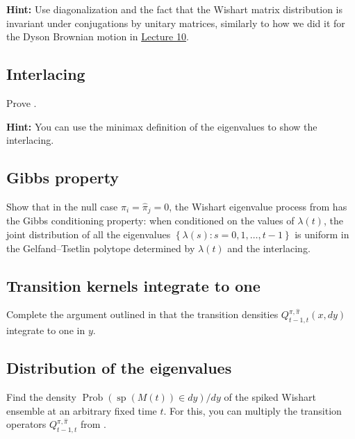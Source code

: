 \documentclass[letterpaper,11pt,oneside,reqno]{article}
\numberwithin{equation}{section}
\theoremstyle{definition}
\begin{document}
\medskip
\noindent
\textbf{Hint:} Use diagonalization and
the fact that the Wishart matrix distribution is invariant under
conjugations by unitary matrices,
similarly to how we did it for the Dyson Brownian motion in
\href{https://lpetrov.cc/rmt25/rmt25-notes/rmt2025-l10.pdf}{Lecture 10}.


\subsection{Interlacing}
\label{prob:interlacing}

Prove .

\medskip
\noindent
\textbf{Hint:} You can use the minimax definition of the eigenvalues to show the interlacing.

\subsection{Gibbs property}
\label{prob:Gibbs}

Show that in the null case \(\pi_i = \hat\pi_j = 0\), the
Wishart eigenvalue process
from 
has the Gibbs conditioning property:
when conditioned on the values of
$\lambda(t)$, the joint distribution of
all the eigenvalues
$\left\{ \lambda(s)\colon s=0,1,\ldots,t-1  \right\}$
is uniform in the Gelfand--Tsetlin polytope
determined by $\lambda(t)$ and the interlacing.


\subsection{Transition kernels integrate to one}
\label{prob:CauchyBinet}

Complete the argument outlined in 
that the transition densities $Q^{\pi,\hat\pi}_{t-1,t}(x,dy)$
integrate to one in $y$.


\subsection{Distribution of the eigenvalues}
\label{prob:Wishart_non_null}

Find the density
$\operatorname{Prob}\left( \operatorname{sp}(M(t))\in dy \right)/dy$
of the spiked Wishart ensemble
at an arbitrary fixed time $t$.
For this, you can multiply the transition operators
$Q^{\pi,\hat\pi}_{t-1,t}$ from .
\end{document}
